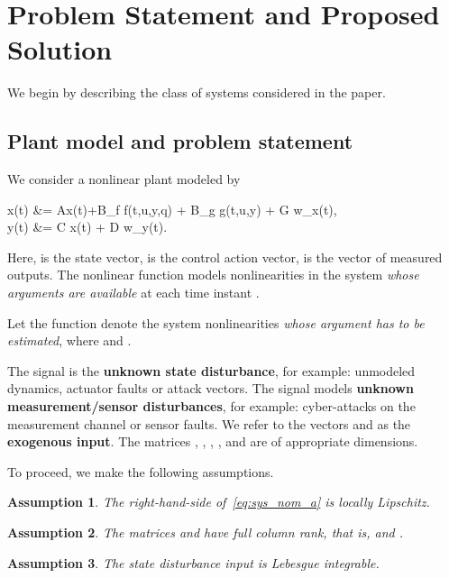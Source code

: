 \documentclass[times, doublespace]{rncauth}
\newtheorem{assumption}{Assumption}
\begin{document}
\section{Problem Statement and Proposed Solution}\label{sec:prob}
We begin by describing the class of systems considered in the paper.  
\subsection{Plant model and problem statement}
We consider a nonlinear plant modeled by

	\dot x(t) &= Ax(t)+B_f f(t,u,y,q) + B_g g(t,u,y) +  G w_x(t),\label{eq:sys_nom_a}\\
	y(t) &= C x(t) + D w_y(t).
	
Here,  is the state vector,  is the control action vector,  is the vector of measured outputs. The nonlinear function  models nonlinearities in the system \textit{whose arguments are available} at each time instant . 


Let the function  denote the system nonlinearities \textit{whose argument  has to be estimated}, where  and . 

The signal  is the \textbf{unknown state disturbance}, for example: unmodeled dynamics, actuator faults or attack vectors. The signal  models \textbf{unknown measurement/sensor disturbances}, for example: cyber-attacks on the measurement channel or sensor faults. We refer to the vectors  and  as the \textbf{exogenous input}. The matrices , , , ,  and  are of appropriate dimensions. 

To proceed, we make the following assumptions.
\begin{assumption}\label{ass:local_lipz}
The right-hand-side of~\eqref{eq:sys_nom_a} is locally Lipschitz. 
\end{assumption}
\begin{assumption}\label{asmp:ranks}
The matrices  and  have full column rank, that is,  and . 
\end{assumption}
\begin{assumption}\label{asmp:faults_bdd}
The state disturbance input  is Lebesgue integrable.
\end{assumption}
\end{document}
